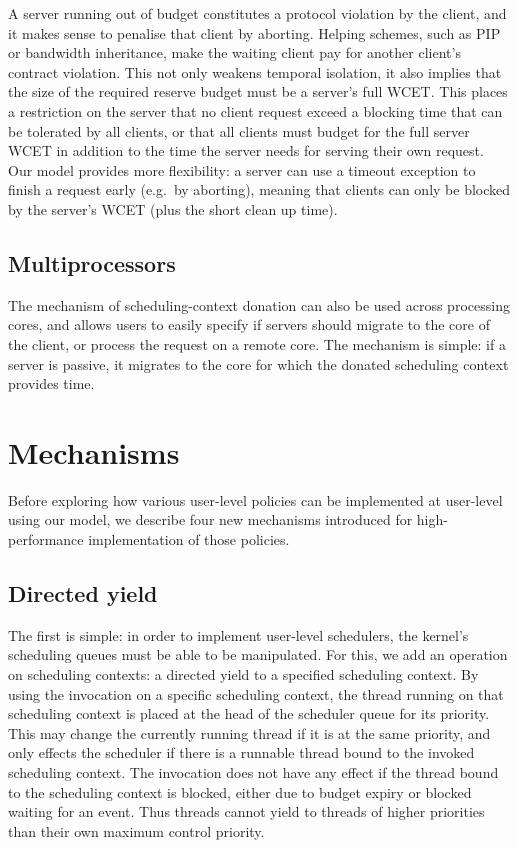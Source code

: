 A server running out of budget constitutes a protocol violation
by the client, and it makes sense to penalise that
client by aborting. Helping schemes, such as \gls{PIP} or bandwidth
inheritance,
make the waiting client pay for
another client's contract violation. This not only weakens temporal isolation,
it also implies that the size of the required reserve budget
must be a server's full WCET. This places a restriction on the server
that no client request exceed a blocking time that can be tolerated by
all clients, or that all clients must budget for the full server WCET in
addition to the time the server needs for serving their own request.
Our model provides more flexibility: a server can use a timeout
exception to finish a request early (e.g.\ by aborting), meaning that clients can only be
blocked by the server's \gls{WCET} (plus the short
clean up time).

\subsection{Multiprocessors}

The mechanism of scheduling-context donation can also be used across processing cores, and 
allows users to easily specify if servers should migrate to the core of the client, or 
process the request on a remote core. 
The mechanism is simple: if a
server is passive, it migrates to the core for which the donated scheduling context provides
time. 

\section{Mechanisms}
\label{sec:model-mechanisms}

Before exploring how various user-level policies can be implemented at user-level using our model, we describe
four new mechanisms introduced for high-performance implementation of those policies.

\subsection{Directed yield}

The first is simple: in order to implement user-level schedulers, the kernel's scheduling queues
must be able to be manipulated. For this, we add an operation on scheduling contexts: a
directed yield to a specified scheduling context. By using the \scyieldto invocation on 
a specific scheduling context, the thread running on that scheduling context is placed at the head
of the scheduler queue for its priority. 
This may change the currently running thread if it is at the same priority, and only effects the
scheduler if there is a runnable thread bound to the invoked scheduling context. The invocation does
not have any effect if the thread bound to the scheduling context is blocked, either due to budget
expiry or blocked waiting for an event. Thus threads cannot
yield to threads of higher priorities than their own maximum control priority.

